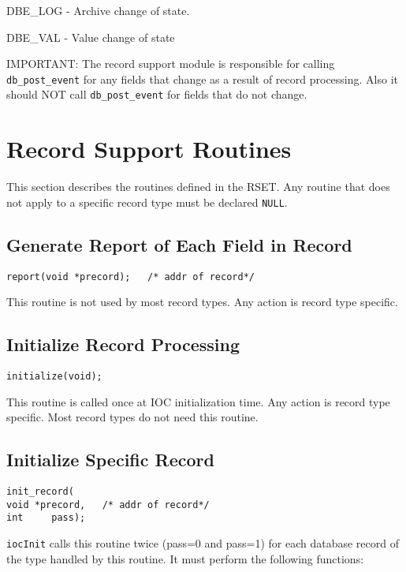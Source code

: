 DBE\_LOG - Archive change of state.

DBE\_VAL - Value change of state

IMPORTANT: The record support module is responsible for calling \verb|db_post_event| for any fields that change as a 
result of record processing. Also it should NOT call \verb|db_post_event| for fields that do not change.

\section{Record Support Routines}

This section describes the routines defined in the RSET. Any routine that does not apply to a specific record type must be 
declared \verb|NULL|.

\subsection{Generate Report of Each Field in Record}

\begin{verbatim}report(void *precord);   /* addr of record*/
\end{verbatim}This routine is not used by most record types. Any action is record type specific.

\subsection{Initialize Record Processing}

\begin{verbatim}initialize(void);
\end{verbatim}This routine is called once at IOC initialization time. Any action is record type specific. Most record types do not need 
this routine.

\subsection{Initialize Specific Record}

\begin{verbatim}init_record(
void *precord,   /* addr of record*/
int     pass);
\end{verbatim}\verb|iocInit| calls this routine twice (pass=0 and pass=1) for each database record of the type handled by this routine. It must 
perform the following functions:

